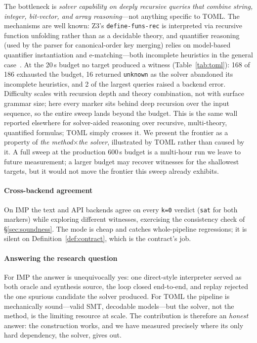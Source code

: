 \documentclass[sigplan,review,anonymous]{acmart}
\theoremstyle{definition}
\theoremstyle{remark}
\newcommand{\imp}{IMP}
\newcommand{\toml}{TOML}
\newcommand{\code}[1]{\texttt{#1}}
\begin{document}
The bottleneck is \emph{solver capability on deeply recursive queries that combine
string, integer, bit-vector, and array reasoning}---not anything specific to
\toml{}. The mechanisms are well known: Z3's \code{define-funs-rec} is interpreted
via recursive function unfolding rather than as a decidable theory, and quantifier
reasoning (used by the parser for canonical-order key merging) relies on
model-based quantifier instantiation and e-matching---both incomplete heuristics
in the general case~\cite{demoura2008z3,barrett2017smtlib}. At the 20\,s budget no
target produced a witness (Table~\ref{tab:toml}): 168 of 186 exhausted the budget,
16 returned \code{unknown} as the solver abandoned its incomplete heuristics, and 2
of the largest queries raised a backend error. Difficulty scales with recursion
depth and theory combination, not with surface grammar size; here every marker sits
behind deep recursion over the input sequence, so the entire sweep lands beyond the
budget. This is the same wall reported elsewhere for solver-aided reasoning
over recursive, multi-theory, quantified formulas; \toml{} simply crosses it. We
present the frontier as a property of \emph{the method$\times$the solver},
illustrated by \toml{} rather than caused by it. A full sweep at the production
600\,s budget is a multi-hour run we leave to future measurement; a larger budget
may recover witnesses for the shallowest targets, but it would not move the
frontier this sweep already exhibits.

\paragraph{Cross-backend agreement}
On \imp{} the text and API backends agree on every \code{k=0} verdict (\code{sat}
for both markers) while exploring different witnesses, exercising the consistency
check of \S\ref{sec:soundness}. The mode is cheap and catches whole-pipeline
regressions; it is silent on Definition~\ref{def:contract}, which is the
contract's job.

\paragraph{Answering the research question}
For \imp{} the answer is unequivocally yes: one direct-style interpreter served as
both oracle and synthesis source, the loop closed end-to-end, and replay rejected
the one spurious candidate the solver produced. For \toml{} the pipeline is
mechanically sound---valid SMT, decodable models---but the solver, not the method,
is the limiting resource at scale. The contribution is therefore an
\emph{honest} answer: the construction works, and we have measured precisely where
its only hard dependency, the solver, gives out.
\end{document}

